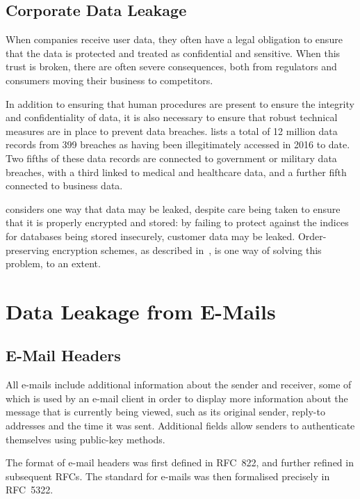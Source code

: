 \subsection{Corporate Data Leakage}

When companies receive user data, they often have a legal obligation to ensure
that the data is protected and treated as confidential and sensitive.  When
this trust is broken, there are often severe consequences, both from regulators
and consumers moving their business to competitors.

In addition to ensuring that human procedures are present to ensure the
integrity and confidentiality of data, it is also necessary to ensure that
robust technical measures are in place to prevent data breaches. 
\cite{2016_data_breach_category_summary_2016} lists a total of 12 million data
records from 399 breaches as having been illegitimately accessed in 2016 to date.
Two fifths of these data records are connected to government or military data breaches,
with a third linked to medical and healthcare data, and a further fifth connected
to business data.

\cite{squicciarini2010preventing} considers one way that data may be leaked,
despite care being taken to ensure that it is properly encrypted and stored: by
failing to protect against the indices for databases being stored insecurely,
customer data may be leaked.  Order-preserving encryption schemes, as described
in~\cite{agrawal2004order}, is one way of solving this problem, to an extent.

\section{Data Leakage from E-Mails}

\subsection{E-Mail Headers}

All e-mails include additional information about the sender and receiver, some
of which is used by an e-mail client in order to display more information about
the message that is currently being viewed, such as its original sender,
reply-to addresses and the time it was sent.  Additional fields allow senders
to authenticate themselves using public-key methods.

The format of e-mail headers was first defined in RFC~822, and further refined
in subsequent RFCs.  The standard for e-mails was then formalised precisely in
RFC~5322.

